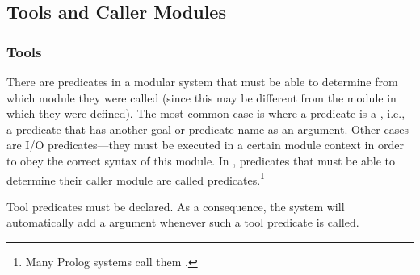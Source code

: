 \subsection{Tools and Caller Modules}

\subsubsection{Tools\label{tools}}

There are predicates in a modular system that must be able to determine from
which
module they were called (since this may be different from the module
in which they were defined).
The most common case is where a predicate is a ,
i.e., a predicate that has another goal or predicate name as an argument.
Other cases are I/O predicates---they must be executed in a
certain module context in order to obey the correct syntax of this module.
In {\eclipse},  predicates that must be able to determine their caller module
are called  predicates.\footnote{
    Many Prolog systems call them .}

Tool predicates must be declared.  As a consequence, the system will
automatically add a  argument whenever such a tool
predicate is called.

